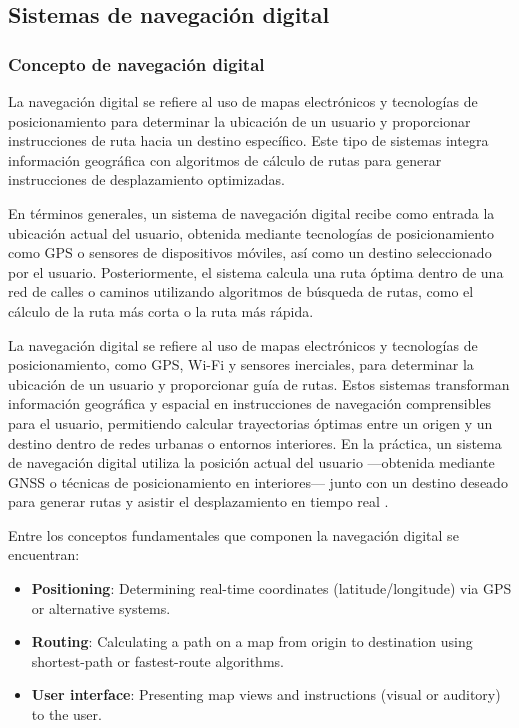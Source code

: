 \subsection{Sistemas de navegación digital}

\subsubsection{Concepto de navegación digital}

La navegación digital se refiere al uso de mapas electrónicos y tecnologías de posicionamiento para determinar la ubicación de un usuario y proporcionar instrucciones de ruta hacia un destino específico. Este tipo de sistemas integra información geográfica con algoritmos de cálculo de rutas para generar instrucciones de desplazamiento optimizadas.\cite{google_directions_api}

En términos generales, un sistema de navegación digital recibe como entrada la ubicación actual del usuario, obtenida mediante tecnologías de posicionamiento como GPS o sensores de dispositivos móviles, así como un destino seleccionado por el usuario. Posteriormente, el sistema calcula una ruta óptima dentro de una red de calles o caminos utilizando algoritmos de búsqueda de rutas, como el cálculo de la ruta más corta o la ruta más rápida.\cite{google_directions_api}

La navegación digital se refiere al uso de mapas electrónicos y tecnologías de posicionamiento, como GPS, Wi-Fi y sensores inerciales, para determinar la ubicación de un usuario y proporcionar guía de rutas. Estos sistemas transforman información geográfica y espacial en instrucciones de navegación comprensibles para el usuario, permitiendo calcular trayectorias óptimas entre un origen y un destino dentro de redes urbanas o entornos interiores. En la práctica, un sistema de navegación digital utiliza la posición actual del usuario —obtenida mediante GNSS o técnicas de posicionamiento en interiores— junto con un destino deseado para generar rutas y asistir el desplazamiento en tiempo real \cite{google_directions_api,digital_navigation_spatial}.

Entre los conceptos fundamentales que componen la navegación digital se encuentran:

\begin{itemize}
\item \textbf{Positioning}: Determining real-time coordinates (latitude/longitude) via GPS or alternative systems.
\item \textbf{Routing}: Calculating a path on a map from origin to destination using shortest-path or fastest-route algorithms.
\item \textbf{User interface}: Presenting map views and instructions (visual or auditory) to the user.
\end{itemize}

